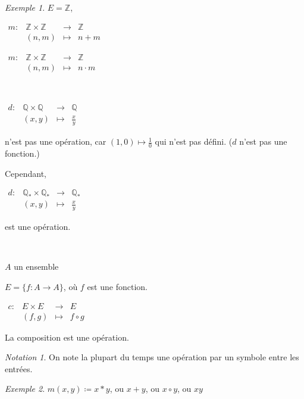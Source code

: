 \documentclass{report}
\newcommand*{\entiers}{\mathbb{Z}}
\newcommand*{\rationels}{\mathbb{Q}}
\theoremstyle{definition}
\theoremstyle{remark}
\newtheorem*{exem}{Exemple}
\newtheorem*{nota}{Notation}
\begin{document}
	\begin{exem}
		$E=\entiers$,

		$\begin{array}{rrcl}
			m:&\entiers \times \entiers &\longrightarrow& \entiers\\
			&(n,m)&\longmapsto&n + m
		\end{array}$

		$\begin{array}{rrcl}
			m:&\entiers \times \entiers &\longrightarrow& \entiers\\
			&(n,m)&\longmapsto&n \cdot m
		\end{array}$

		~

		$\begin{array}{rrcl}
			d:&\rationels \times \rationels&\longrightarrow&\rationels\\
			&(x,y)&\longmapsto&\frac{x}{y}
		\end{array}$

		n'est pas une op\'eration, car $(1,0) \mapsto \frac{1}{0}$ qui n'est pas d\'efini. ($d$ n'est pas une fonction.)

		Cependant,

		$\begin{array}{rrcl}
			d:&\rationels_* \times \rationels_*&\longrightarrow&\rationels_*\\
			&(x,y)&\longmapsto&\frac{x}{y}
		\end{array}$

		est une op\'eration.

		~

		$A$ un ensemble

		$E=\{f:A \to A\}$, o\`u $f$ est une fonction.

		$\begin{array}{rrcl}
			c:&E \times E&\longrightarrow&E\\
			&(f,g)&\longmapsto&f \circ g
		\end{array}$

		La composition est une op\'eration.
	\end{exem}

	\begin{nota}
		On note la plupart du temps une op\'eration par un symbole entre les entr\'ees.
	\end{nota}

	\begin{exem}
		$m(x,y) \coloneq x*y$, ou $x+y$, ou $x \circ y$, ou $xy$
	\end{exem}
\end{document}
